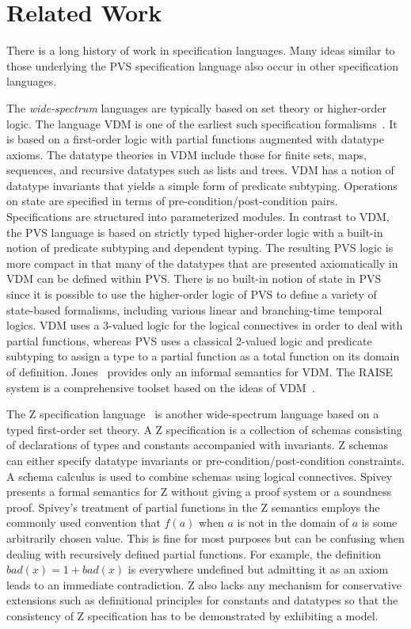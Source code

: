 \documentclass [12pt,twoside]{cslreport}
\begin{document}
\section{Related Work}

There is a long history of work in specification languages.
Many  ideas similar to those underlying the PVS specification language
also occur in other specification languages.  

The {\em wide-spectrum\/} languages are typically based on set theory or
higher-order logic.  The language VDM is one of the earliest such
specification formalisms~\cite{Jones:VDM}.  It is based on a first-order
logic with partial functions augmented with datatype axioms.  The datatype
theories in VDM include those for finite sets, maps, sequences, and
recursive datatypes such as lists and trees.  VDM has a notion of datatype
invariants that yields a simple form of predicate subtyping.  Operations
on state are specified in terms of pre-condition/post-condition pairs.
Specifications are structured into parameterized modules.  In contrast to
VDM, the PVS language is based on strictly typed higher-order logic with a
built-in notion of predicate subtyping and dependent typing.  The
resulting PVS logic is more compact in that many of the datatypes that are
presented axiomatically in VDM can be defined within PVS.  There is no
built-in notion of state in PVS since it is possible to use the
higher-order logic of PVS to define a variety of state-based formalisms,
including various linear and branching-time temporal logics.  VDM uses a
3-valued logic for the logical connectives in order to deal
with partial functions, whereas PVS uses a classical 2-valued logic and
predicate subtyping to assign a type to a partial function as a total
function on its domain of definition.  Jones~\cite{Jones:VDM} provides
only an informal semantics for VDM.  The RAISE system is a comprehensive
toolset based on the ideas of VDM~\cite{RAISE:book}.

The Z specification language~\cite{Z-understanding} is another
wide-spectrum language based on a typed first-order set theory.  A Z
specification is a collection of schemas consisting of declarations of
types and constants accompanied with invariants.  Z schemas can either
specify datatype invariants or pre-condition/post-condition constraints.
A schema calculus is used to combine schemas using logical connectives.
Spivey~\cite{Z-understanding} presents a formal semantics for Z without
giving a proof system or a soundness proof.  Spivey's treatment of
partial functions in the Z semantics employs the commonly used convention
that $f(a)$ when $a$ is not in the domain of $a$ is some arbitrarily
chosen value.  This is fine for most purposes but can be confusing when
dealing with recursively defined partial functions.  For example, the
definition $\mathit{bad}(x) = 1 + \mathit{bad}(x)$ is everywhere undefined but
admitting it as an axiom leads to an immediate contradiction.  Z also
lacks any mechanism for conservative extensions such as definitional
principles for constants and datatypes so that the consistency of Z
specification has to be demonstrated by exhibiting a model.
\end{document}
